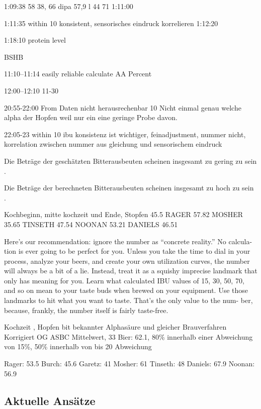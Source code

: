 \documentclass[a4paper,parskip=half]{scrartcl}
\begin{document}
1:09:38 58
38, 66
dipa 57,9 l 44 71
1:11:00

1:11:35 within 10 %
konsistent, sensorisches eindruck korrelieren
1:12:20

1:18:10
protein level 
\parencite{Beechum2017a}

BSHB

11:10--11:14
easily reliable calculate AA Percent

12:00--12:10
11-30%

20:55-22:00
From Daten nicht herausrechenbar
10 %
Nicht einmal genau welche alpha der Hopfen weil nur ein eine geringe 
Probe davon.

22:05-23
within 10 ibu
konsistenz ist wichtiger, feinadjustment, nummer nicht,
korrelation zwischen nummer aus gleichung und sensorischem eindruck
\parencite{Smith2011}

Die Beträge der geschätzten
Bitterausbeuten scheinen insgesamt zu gering zu sein \parencite{Jones1995}.

Die Beträge
der berechneten Bitterausbeuten scheinen insgesamt zu hoch zu sein \parencite{Jones1995}.

\parencite[65]{Hall1997}
Kochbeginn, mitte kochzeit und Ende, Stopfen
45.5
RAGER  57.82
MOSHER 35.65
TINSETH  47.54
NOONAN 53.21
DANIELS 46.51

\parencite[65\psqq]{Beechum2017}
Here’s our recommendation: ignore the
number as “concrete reality.” No calcula-
tion is ever going to be perfect for you.
Unless you take the time to dial in your
process, analyze your beers, and create
your own utilization curves, the number
will always be a bit of a lie. Instead, treat it
as a squishy imprecise landmark that only
has meaning for you.
Learn what calculated IBU values of 15,
30, 50, 70, and so on mean to your taste
buds when brewed on your equipment.
Use those landmarks to hit what you want
to taste. That’s the only value to the num-
ber, because, frankly, the number itself is
fairly taste-free.

\parencite{Bonham2001}
Kochzeit , Hopfen bit bekannter Alphasäure und gleicher Brauverfahren
Korrigiert OG
ASBC Mittelwert, 33 Bier: 62.1, 80\% innerhalb einer Abweichung von 15\%, 50\% innerhalb
von  bis 20 Abweichung

Rager: 53.5
Burch: 45.6
Garetz: 41
Mosher: 61
Tinseth: 48
Daniels: 67.9
Noonan: 56.9



\subsection*{Aktuelle Ansätze}
\end{document}
